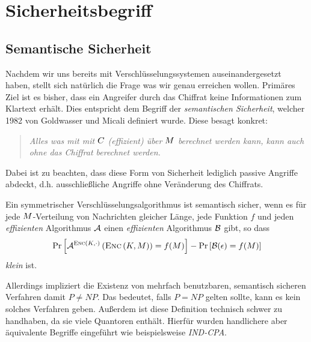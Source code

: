 \chapter{Sicherheitsbegriff}

\section{Semantische Sicherheit}
\label{ch:sicherheitsbegriffe:semantischesicherheit}
Nachdem wir uns bereits mit Verschlüsselungssystemen auseinandergesetzt haben, stellt sich natürlich die Frage was wir genau erreichen wollen. Primäres Ziel
ist es bisher, dass ein Angreifer durch das Chiffrat keine Informationen zum Klartext erhält. Dies entspricht dem Begriff der \emph{semantischen Sicherheit},
welcher 1982 von Goldwasser und Micali definiert wurde. Diese besagt konkret:
\begin{quote}
\emph{Alles was mit mit $C$ (effizient) über $M$ berechnet werden kann, kann auch ohne das Chiffrat berechnet werden.}
\end{quote}
Dabei ist zu beachten, dass diese Form von Sicherheit lediglich passive Angriffe abdeckt, d.h. ausschließliche Angriffe ohne Veränderung des Chiffrats.
\vspace{10pt}

\begin{definition}
Ein symmetrischer Verschlüsselungsalgorithmus ist semantisch sicher, wenn es für jede $M$-Verteilung von Nachrichten gleicher Länge, jede Funktion $f$
und jeden \emph{effizienten} Algorithmus $\mathcal{A}$ einen \emph{effizienten} Algorithmus $\mathcal{B}$ gibt, so dass
\begin{equation*}
\text{Pr}\left[ \mathcal{A}^{\textsc{Enc} (K,\cdot)} \left( \textsc{Enc} \left( K, M \right) \right) = f(M) \right] - \text{Pr} \left[ \mathcal{B} (\epsilon) = f (M) \right]
\end{equation*}
\emph{klein} ist.
\end{definition}
\vspace{10pt}

Allerdings impliziert die Existenz von mehrfach benutzbaren, semantisch sicheren Verfahren damit $P \neq NP$. Das bedeutet, falls $P = NP$ gelten sollte, kann
es kein solches Verfahren geben. Außerdem ist diese Definition technisch schwer zu handhaben, da sie viele Quantoren enthält. Hierfür wurden handlichere
aber äquivalente Begriffe eingeführt wie beispielsweise \emph{IND-CPA}.

